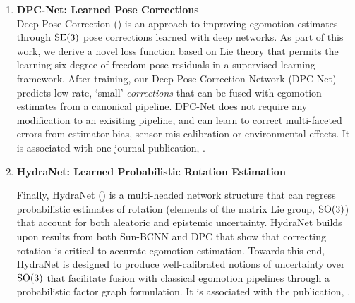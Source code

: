\begin{enumerate}
\item \textbf{DPC-Net: Learned Pose Corrections} \\
Deep Pose Correction () is an approach to improving egomotion estimates through $\mathrm{SE}(3)$ pose corrections learned with deep networks. As part of this work, we derive a novel loss function based on Lie theory that permits the learning six degree-of-freedom pose residuals in a supervised learning framework. After training, our Deep Pose Correction Network (DPC-Net) predicts low-rate, `small' \textit{corrections} that can be fused with egomotion estimates from a canonical pipeline. DPC-Net does not require any modification to an exisiting pipeline, and can learn to correct multi-faceted errors from estimator bias, sensor mis-calibration or environmental effects. It is associated with one journal publication, \cite{2018_Peretroukhin_Deep}.

\item \textbf{HydraNet: Learned Probabilistic Rotation Estimation}

Finally, HydraNet () is a multi-headed network structure that can regress probabilistic estimates of rotation (elements of the matrix Lie group, $\mathrm{SO}(3)$) that account for both aleatoric and epistemic uncertainty. HydraNet builds upon results from both Sun-BCNN and DPC that show that correcting rotation is critical to accurate egomotion estimation.  Towards this end, HydraNet is designed to produce well-calibrated notions of uncertainty over $\mathrm{SO}(3)$  that facilitate fusion with classical egomotion pipelines through a probabilistic factor graph formulation. It is associated with the publication, \cite{2019_Peretroukhin_Deep}.

\end{enumerate}

%






